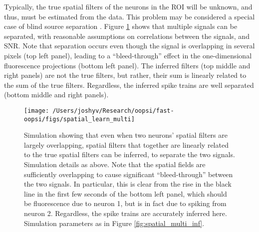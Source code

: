 Typically, the true spatial filters of the neurons in the ROI will be unknown, and thus, must be estimated from the data.  This problem may be considered a special case of blind source separation \cite{BellSejnowski95, MukamelSchnitzer09}. Figure \ref{fig:spatial_multi_learn} shows that multiple signals can be separated, with reasonable assumptions on correlations between the signals, and SNR.  Note that separation occurs even though the signal is overlapping in several pixels (top left panel), leading to a ``bleed-through'' effect in the one-dimensional fluorescence projections (bottom left panel). The inferred filters (top middle and right panels) are not the true filters, but rather, their sum is linearly related to the sum of the true filters.  Regardless, the inferred spike trains are well separated (bottom middle and right panels).







\begin{figure}[h!]
\centering \texttt{[image: /Users/joshyv/Research/oopsi/fast-oopsi/figs/spatial\_learn\_multi]}
\caption[overlapping spatial filters can be estimated]{Simulation showing that even when two neurons' spatial filters are largely overlapping, spatial filters that together are linearly related to the true spatial filters can be inferred, to separate the two signals. Simulation details as above. Note that the spatial fields are sufficiently overlapping to cause significant ``bleed-through'' between the two signals.  In particular, this is clear from the rise in the black line in the first few seconds of the bottom left panel, which should be fluorescence due to neuron 1, but is in fact due to spiking from neuron 2. Regardless, the spike trains are accurately inferred here.  Simulation parameters as in Figure \ref{fig:spatial_multi_inf}.} \label{fig:spatial_multi_learn}
\end{figure}


